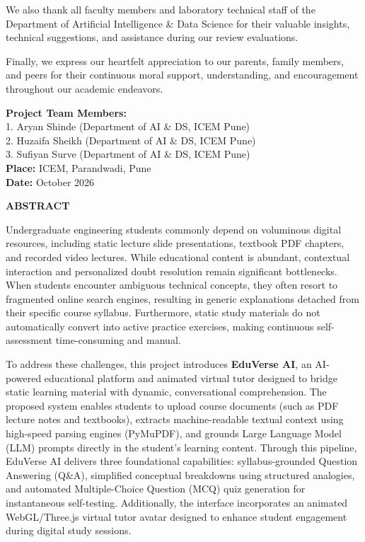 \documentclass[11pt,a4paper]{report}
\begin{document}
We also thank all faculty members and laboratory technical staff of the Department of Artificial Intelligence \& Data Science for their valuable insights, technical suggestions, and assistance during our review evaluations.

Finally, we express our heartfelt appreciation to our parents, family members, and peers for their continuous moral support, understanding, and encouragement throughout our academic endeavors.

\vspace{1.5cm}
\noindent
\textbf{Project Team Members:}\\[0.3cm]
1. Aryan Shinde \hfill (Department of AI \& DS, ICEM Pune)\\[0.15cm]
2. Huzaifa Sheikh \hfill (Department of AI \& DS, ICEM Pune)\\[0.15cm]
3. Sufiyan Surve \hfill (Department of AI \& DS, ICEM Pune)\\[0.5cm]
\textbf{Place:} ICEM, Parandwadi, Pune\\
\textbf{Date:} October 2026
\clearpage

\thispagestyle{plain}
\begin{center}
    {\Large\bfseries\color{icemNavy} ABSTRACT}
\end{center}
\vspace{0.4cm}

Undergraduate engineering students commonly depend on voluminous digital resources, including static lecture slide presentations, textbook PDF chapters, and recorded video lectures. While educational content is abundant, contextual interaction and personalized doubt resolution remain significant bottlenecks. When students encounter ambiguous technical concepts, they often resort to fragmented online search engines, resulting in generic explanations detached from their specific course syllabus. Furthermore, static study materials do not automatically convert into active practice exercises, making continuous self-assessment time-consuming and manual.

To address these challenges, this project introduces \textbf{EduVerse AI}, an AI-powered educational platform and animated virtual tutor designed to bridge static learning material with dynamic, conversational comprehension. The proposed system enables students to upload course documents (such as PDF lecture notes and textbooks), extracts machine-readable textual context using high-speed parsing engines (PyMuPDF), and grounds Large Language Model (LLM) prompts directly in the student's learning content. Through this pipeline, EduVerse AI delivers three foundational capabilities: syllabus-grounded Question Answering (Q\&A), simplified conceptual breakdowns using structured analogies, and automated Multiple-Choice Question (MCQ) quiz generation for instantaneous self-testing. Additionally, the interface incorporates an animated WebGL/Three.js virtual tutor avatar designed to enhance student engagement during digital study sessions.
\end{document}
